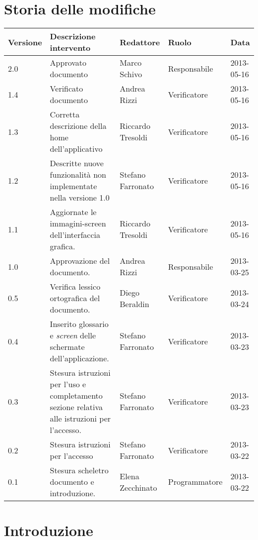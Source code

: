 \section*{Storia delle modifiche}
\begin{longtable}{lp{}lll}
\toprule
Versione & Descrizione intervento & Redattore & Ruolo & Data\\
\midrule %

2.0 & Approvato documento & Marco Schivo & Responsabile & 2013-05-16\\
1.4 & Verificato documento & Andrea Rizzi & Verificatore & 2013-05-16\\
1.3 & Corretta descrizione della home dell'applicativo & Riccardo Tresoldi & Verificatore & 2013-05-16\\
1.2 & Descritte nuove funzionalità non implementate nella versione 1.0 & Stefano Farronato & Verificatore & 2013-05-16\\
1.1 & Aggiornate le immagini-screen dell'interfaccia grafica. & Riccardo Tresoldi & Verificatore & 2013-05-16\\
1.0 & Approvazione del documento. & Andrea Rizzi & Responsabile & 2013-03-25\\
0.5 & Verifica lessico ortografica del documento. & Diego Beraldin & Verificatore & 2013-03-24\\
0.4 & Inserito glossario e \textit{screen} delle schermate dell'applicazione.& Stefano Farronato & Verificatore & 2013-03-23\\
0.3 & Stesura istruzioni per l'uso e completamento sezione relativa alle istruzioni per l'accesso. & Stefano Farronato & Verificatore & 2013-03-23\\
0.2 & Stesura istruzioni per l'accesso & Stefano Farronato & Verificatore & 2013-03-22\\
0.1 & Stesura scheletro documento e introduzione. & Elena Zecchinato & Programmatore & 2013-03-22\\
\bottomrule
\end{longtable}
\newpage




\setcounter{page}{1}
\pagestyle{normal}

\section{Introduzione}
